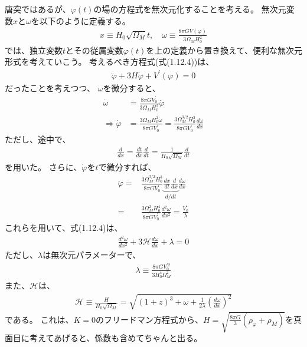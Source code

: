 \documentclass[11pt]{ltjsarticle}
\theoremstyle{plain}
\theoremstyle{break}
\begin{document}
唐突ではあるが、$\varphi(t)$の場の方程式を無次元化することを考える。
無次元変数$x$と$\omega$を以下のように定義する。
\begin{align}
  x \equiv  H_0 \sqrt{\Omega_M} t , \quad \omega \equiv \frac{8\pi G V(\varphi)}{3 \Omega_M H_0^2}
\end{align}%
では、独立変数$t$とその従属変数$\varphi(t)$を上の定義から置き換えて、便利な無次元形式を考えていこう。
考えるべき方程式(式(1.12.4))は、%
\begin{align}
  \ddot{\varphi}+3 H \dot{\varphi}+V^{\prime}(\varphi)=0
\end{align}%
だったことを考えつつ、
$\omega$を微分すると、
\begin{align}
   \dot{\omega} &= \frac{8 \pi G V_{0}^{\prime}}{3 \Omega_{M} H_{0}^{2}} \dot{\varphi} \\
   \Rightarrow \dot{\varphi}&=\frac{3 \Omega_{M} H_{0}^{2} \dot{\omega}}{8 \pi G V_{0}^{\prime}} =\frac{3 \Omega_{M}^{3 / 2} H_{0}^{3}}{8 \pi G V_{0}^{\prime}} \frac{d \omega}{d x}
\end{align}%
ただし、途中で、
\begin{align}
  \frac{d}{dx} = \frac{dt}{dx} \frac{d}{dt} = \frac{1}{H_0 \sqrt{\Omega_{M}} }\frac{d}{dt}
\end{align}%
を用いた。
さらに、$\dot{\varphi}$を$t$で微分すれば、
\begin{align}
  \ddot{\varphi} 
    =& \frac{3 \Omega_{M}^{3 / 2} H_{0}^{3}}{8 \pi G V_{0}^{\prime}}  \underbrace{\frac{dx}{dt} \frac{d}{dx}}_{d/dt}\frac{d \omega}{d x}\\
    =& \frac{3 \Omega_{M}^{2} H_{0}^{4}}{8 \pi G V_{0}^{\prime}} \frac{d^2 \omega }{dx^2} = \frac{V_{0}^{\prime} }{\lambda}
\end{align}%
これらを用いて、式(1.12.4)は、%
\begin{align}
  \frac{d^{2} \omega}{d x^{2}}+3 \mathcal{H} \frac{d \omega}{d x}+\lambda=0 \label{eq:1.12.17}
\end{align}%
ただし、$\lambda$は無次元パラメーターで、
\begin{align}
  \lambda \equiv \frac{8 \pi G V_{0}^{\prime 2}}{3 H_{0}^{4} \Omega_{M}^{2}}
\end{align}%
また、$\mathcal{H}$は、
\begin{align}
  \mathcal{H} \equiv \frac{H}{H_{0} \sqrt{\Omega_{M}}}=\sqrt{(1+z)^{3}+\omega+\frac{1}{2 \lambda}\left(\frac{d \omega}{d x}\right)^{2}}
\end{align}
である。
これは、$K=0$のフリードマン方程式から、$H  = \sqrt{\frac{8\pi G}{3} (\rho_{\varphi} + \rho_{M})}$を真面目に考えてあげると、係数も含めてちゃんと出る。
\end{document}

